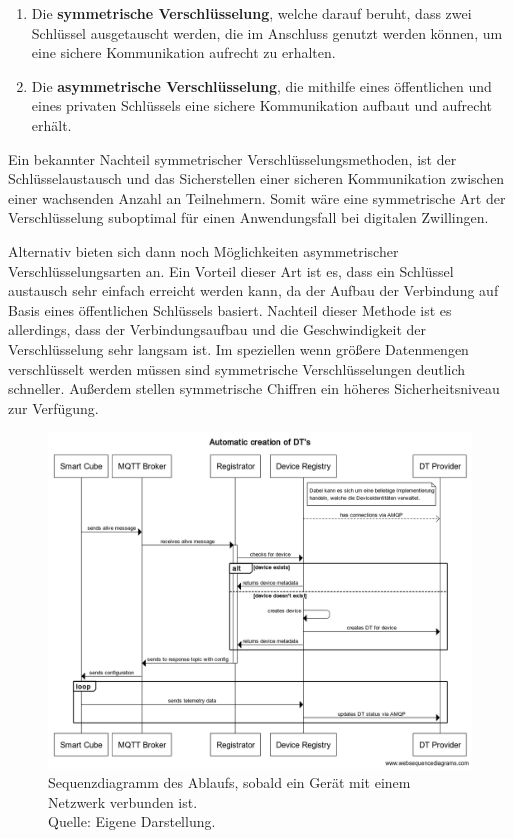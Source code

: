 \begin{enumerate}
    \item Die \textbf{symmetrische Verschlüsselung}, welche darauf beruht, dass zwei Schlüssel ausgetauscht werden, die im Anschluss genutzt werden können, um eine sichere Kommunikation aufrecht zu erhalten.
    \item  Die \textbf{asymmetrische Verschlüsselung}, die mithilfe eines öffentlichen und eines privaten Schlüssels eine sichere Kommunikation aufbaut und aufrecht erhält.
\end{enumerate}

Ein bekannter Nachteil symmetrischer Verschlüsselungsmethoden, ist der Schlüsselaustausch und das Sicherstellen einer sicheren Kommunikation zwischen einer wachsenden Anzahl an Teilnehmern. Somit wäre eine symmetrische Art der Verschlüsselung suboptimal für einen Anwendungsfall bei digitalen Zwillingen.

Alternativ bieten sich dann noch Möglichkeiten asymmetrischer Verschlüsselungsarten an. Ein Vorteil dieser Art ist es, dass ein Schlüssel austausch sehr einfach erreicht werden kann, da der Aufbau der Verbindung auf Basis eines öffentlichen Schlüssels basiert. Nachteil dieser Methode ist es allerdings, dass der Verbindungsaufbau und die Geschwindigkeit der Verschlüsselung sehr langsam ist. Im speziellen wenn größere Datenmengen verschlüsselt werden müssen sind symmetrische Verschlüsselungen deutlich schneller. Außerdem stellen symmetrische Chiffren ein höheres Sicherheitsniveau zur Verfügung.

\begin{figure}
    \centering
    \includegraphics[width=1.0\linewidth]{img/automatic_creation.png}
    \caption[Automatische Erstellung digitaler Zwillinge]{Sequenzdiagramm des Ablaufs, sobald ein Gerät mit einem Netzwerk verbunden ist.\\Quelle: Eigene Darstellung.}
    \label{fig:automatic_creation}
\end{figure}

